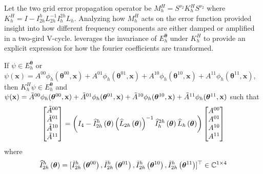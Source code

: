 \documentclass[12pt]{article}
\begin{document}
Let the two grid error propagation operator be $M^{H}_h = S^{\nu_2}K^H_hS^{\nu_2}$ where $K^H_h = I - I^{h}_{2h}L_{2h}^{-1}I^{2h}_hL_h$. Analyzing how $M^H_h$ acts on the error function provided insight into how different frequency components are either damped or amplified in a two-gird V-cycle.  leverages the invariance of  $E^{\boldsymbol{\theta}}_h$ under $K^H_h$ to provide an explicit expression for how the fourier coefficients are transformed. 

\begin{theorem} \label{th:lfatwogrid}
    If  $\psi \in E^{\boldsymbol{\theta}}_h$ or $\psi(\mathbf{x})= A^{00}\phi_h(\boldsymbol{\theta}^{00}, \mathbf{x}) + A^{01}\phi_h(\boldsymbol{\theta}^{01}, \mathbf{x}) + A^{10}\phi_h(\boldsymbol{\theta}^{10}, \mathbf{x}) + A^{11}\phi_h(\boldsymbol{\theta}^{11}, \mathbf{x})$, then $K^H_h \psi \in E^{\boldsymbol{\theta}}_h$ and $\psi(\mathbf{x})= \Tilde{A}^{00}\phi_h(\boldsymbol{\theta}^{00}, \mathbf{x}) + \Tilde{A}^{01}\phi_h(\boldsymbol{\theta}^{01}, \mathbf{x}) + \Tilde{A}^{10}\phi_h(\boldsymbol{\theta}^{10}, \mathbf{x}) + \Tilde{A}^{11}\phi_h(\boldsymbol{\theta}^{11}, \mathbf{x})$ such that
    \begin{align*}
        \begin{bmatrix}
            \Tilde{A}^{00} \\
            \Tilde{A}^{01} \\
            \Tilde{A}^{10} \\
            \Tilde{A}^{11}
        \end{bmatrix} = \left(I_4 - \widehat{I}^h_{2h}\left(\boldsymbol{\theta}\right)\left(\widehat{L}_{2h}\left(\boldsymbol{\theta}\right)\right)^{-1}\widehat{I}^{2h}_h\left(\boldsymbol{\theta}\right)\widehat{L}_h\left(\boldsymbol{\theta}\right)\right)\begin{bmatrix}
            A^{00} \\
            A^{01} \\
            A^{10} \\
            A^{11}
        \end{bmatrix}
    \end{align*}
    where 
    \begin{align*}
    \widehat{I}^h_{2h}\left(\boldsymbol{\theta}\right) &= [\Tilde{I}^h_{2h}\left(\boldsymbol{\theta}^{00}\right), \Tilde{I}^h_{2h}\left(\boldsymbol{\theta}^{01}\right), \Tilde{I}^h_{2h}\left(\boldsymbol{\theta}^{10}\right), \Tilde{I}^h_{2h}\left(\boldsymbol{\theta}^{11}\right)]^{\top} \in \mathbb{C}^{1 \times 4} \\

\end{align*}
\end{theorem}
\end{document}
